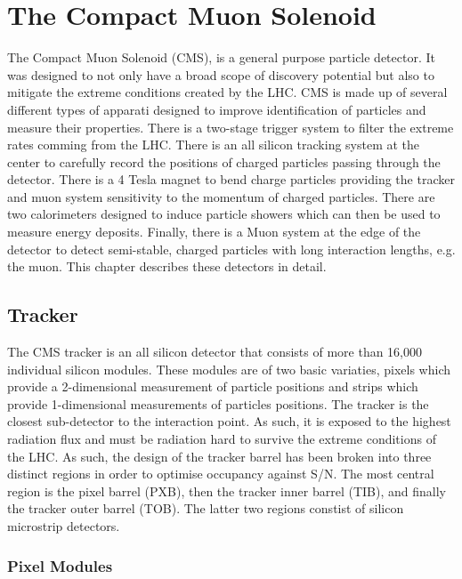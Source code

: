 \section{The Compact Muon Solenoid}
\label{sec:CMS}

The Compact Muon Solenoid (CMS), is a general purpose particle detector.  It
was designed to not only have a broad scope of discovery potential but also
to mitigate the extreme conditions created by the LHC.  CMS is made up of
several different types of apparati designed to improve identification of 
particles and measure their properties.  There is a two-stage trigger system
to filter the extreme rates comming from the LHC.  There is an all silicon 
tracking system at the center to carefully record the positions of charged 
particles passing through the detector.  There is a 4 Tesla magnet to bend 
charge particles 
providing the tracker and muon system sensitivity to the momentum of charged 
particles.  There are two calorimeters designed to induce particle showers 
which can then be used to measure energy deposits.  Finally, there is a Muon 
system 
at the edge of the detector to detect semi-stable, charged particles with long 
interaction lengths, e.g. the muon. This chapter describes these detectors in
detail. 

\subsection{Tracker}
\label{sec:Tracker}

The CMS tracker is an all silicon detector that consists of more than 16,000
individual silicon modules.  These modules are of two basic variaties, pixels
which provide a 2-dimensional measurement of particle positions and strips
which provide 1-dimensional measurements of particles positions.  The tracker
is the closest sub-detector to the interaction point.  As such, it is exposed 
to the highest radiation flux and must be radiation hard to survive the extreme
conditions of the LHC.  As such, the design of the tracker barrel has been 
broken into three distinct regions in order to optimise occupancy against
S/N.  The most central region is the pixel barrel (PXB), then the tracker
inner barrel (TIB), and finally the tracker outer barrel (TOB).  The latter
two regions constist of silicon microstrip detectors. 

\subsubsection{Pixel Modules}

